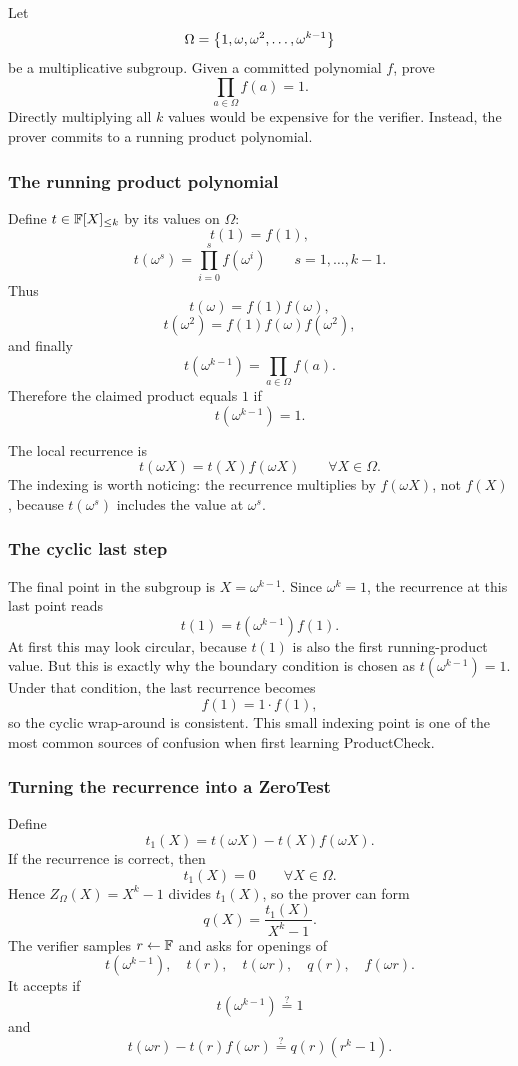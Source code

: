Let
\[
    \Omega=\left\{1,\omega,\omega^2,\ldots,\omega^{k-1}\right\}
\]
be a multiplicative subgroup. Given a committed polynomial $f$, prove
\[
    \prod_{a\in\Omega} f(a)=1.
\]
Directly multiplying all $k$ values would be expensive for the verifier. Instead, the prover commits to a running product polynomial.

\subsubsection*{The running product polynomial}

Define $t\in\mathbb{F}[X]_{\le k}$ by its values on $\Omega$:
\[
    t(1)=f(1),
\]
\[
    t(\omega^s)=\prod_{i=0}^{s}f(\omega^i)
    \qquad s=1,\ldots,k-1.
\]
Thus
\[
    t(\omega)=f(1)f(\omega),
\]
\[
    t(\omega^2)=f(1)f(\omega)f(\omega^2),
\]
and finally
\[
    t(\omega^{k-1})=\prod_{a\in\Omega}f(a).
\]
Therefore the claimed product equals $1$ if
\[
    t(\omega^{k-1})=1.
\]

The local recurrence is
\[
    t(\omega X)=t(X)f(\omega X)
    \qquad\forall X\in\Omega.
\]
The indexing is worth noticing: the recurrence multiplies by $f(\omega X)$, not $f(X)$, because $t(\omega^s)$ includes the value at $\omega^s$.

\subsubsection*{The cyclic last step}

The final point in the subgroup is $X=\omega^{k-1}$. Since $\omega^k=1$, the recurrence at this last point reads
\[
    t(1)=t(\omega^{k-1})f(1).
\]
At first this may look circular, because $t(1)$ is also the first running-product value. But this is exactly why the boundary condition is chosen as $t(\omega^{k-1})=1$. Under that condition, the last recurrence becomes
\[
    f(1)=1\cdot f(1),
\]
so the cyclic wrap-around is consistent. This small indexing point is one of the most common sources of confusion when first learning ProductCheck.

\subsubsection*{Turning the recurrence into a ZeroTest}

Define
\[
    t_1(X)=t(\omega X)-t(X)f(\omega X).
\]
If the recurrence is correct, then
\[
    t_1(X)=0\qquad \forall X\in\Omega.
\]
Hence $Z_\Omega(X)=X^k-1$ divides $t_1(X)$, so the prover can form
\[
    q(X)=\frac{t_1(X)}{X^k-1}.
\]
The verifier samples $r\leftarrow\mathbb{F}$ and asks for openings of
\[
    t(\omega^{k-1}),\quad t(r),\quad t(\omega r),\quad q(r),\quad f(\omega r).
\]
It accepts if
\[
    t(\omega^{k-1})\stackrel{?}{=}1
\]
and
\[
    t(\omega r)-t(r)f(\omega r)
    \stackrel{?}{=}
    q(r)(r^k-1).
\]

